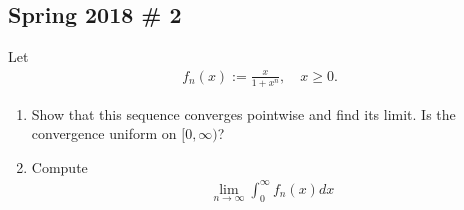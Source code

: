 \hypertarget{spring-2018-2}{%
\subsection{Spring 2018 \# 2}\label{spring-2018-2}}

Let
\begin{align*}
f_{n}(x):=\frac{x}{1+x^{n}}, \quad x \geq 0.
\end{align*}

\begin{enumerate}
\def\labelenumi{\alph{enumi}.}
\item
  Show that this sequence converges pointwise and find its limit. Is the
  convergence uniform on \([0, \infty)\)?
\item
  Compute
  \begin{align*}
  \lim _{n \rightarrow \infty} \int_{0}^{\infty} f_{n}(x) d x
  \end{align*}
\end{enumerate}

